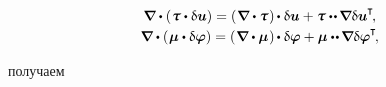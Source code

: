 \begin{otherlanguage}{russian}
\vspace{-0.8em}\noindent
{} 

\nopagebreak\vspace{-0.2em}\begin{equation*}\begin{array}{c}
\boldnabla \dotp \left( \hspace{.1ex} \forcestresstensor \dotp \variation{\fieldofdisplacements} \right)
= \left( \hspace{.12ex} \boldnabla \dotp \forcestresstensor \hspace{.12ex} \right) \hspace{-0.16ex} \dotp \variation{\fieldofdisplacements}
+ \forcestresstensor \dotdotp \hspace{-0.16ex} \boldnabla \variation{\fieldofdisplacements}^{\hspace{-0.05ex}\T} \hspace{-0.3ex} ,
\\[.25em]
%
\boldnabla \dotp \left( \hspace{.1ex} \couplestresstensor \dotp \variation{\fieldofrotations} \right)
= \left( \hspace{.12ex} \boldnabla \dotp \couplestresstensor \hspace{.12ex} \right) \hspace{-0.16ex} \dotp \variation{\fieldofrotations}
+ \couplestresstensor \dotdotp \hspace{-0.16ex} \boldnabla \variation{\fieldofrotations}^{\hspace{-0.05ex}\T} \hspace{-0.3ex} ,
\end{array}\end{equation*}

\vspace{-0.4em}\noindent
получаем


\end{otherlanguage}

